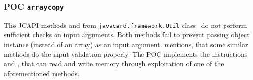 \documentclass{../llncs/llncs}
\begin{document}

\subsubsection{POC \texttt{arraycopy}}\label{subsec:arraycopy-explanation}
The JCAPI methods \arrayCopy and \arrayCopyNonAtomic from \texttt{javacard.framework.Util} class~\cite{jcspecs31download} do not perform sufficient checks on input arguments. Both methods fail to prevent passing object instance (instead of an array) as an input argument. \cite{se:oracle:part1} mentions, that some similar methods do the input validation properly. The POC implements the instructions \readmem and \writemem, that can read and write memory through exploitation of one of the aforementioned methods.


\end{document}
